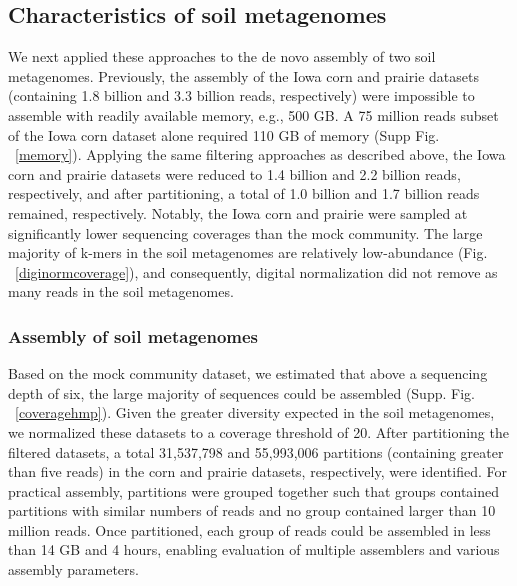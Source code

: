\documentclass[11pt]{article} %
\begin{document}
\subsection{Characteristics of soil metagenomes}

We next applied these approaches to the de novo assembly of two soil metagenomes.  Previously, the assembly of the Iowa corn and prairie datasets (containing 1.8 billion and 3.3 billion reads, respectively) were impossible to assemble with readily available memory, e.g., 500 GB.   A 75 million reads subset of the Iowa corn dataset alone required 110 GB of memory (Supp Fig. ~\ref{memory}).  Applying the same filtering approaches as described above, the Iowa corn and prairie datasets were reduced to 1.4 billion and 2.2 billion reads, respectively, and after partitioning, a total of 1.0 billion and 1.7 billion reads remained, respectively.  Notably, the Iowa corn and prairie were sampled at significantly lower sequencing coverages than the mock community.  %
The large majority of k-mers in the soil metagenomes are relatively low-abundance (Fig. ~\ref{diginormcoverage}), and consequently, digital normalization did not remove as many reads in the soil metagenomes.

\subsubsection{Assembly of soil metagenomes}

Based on the mock community dataset, we estimated that above a sequencing depth of six, the large majority of sequences could be assembled (Supp. Fig. ~\ref{coveragehmp}).  Given the greater diversity expected in the soil metagenomes, we normalized these datasets to a coverage threshold of 20.  After partitioning the filtered datasets, a total 31,537,798 and 55,993,006 partitions (containing greater than five reads) in the corn and prairie datasets, respectively, were identified.  For practical assembly, partitions were grouped together such that groups contained partitions with similar numbers of reads and no group contained larger than 10 million reads.  Once partitioned, each group of reads could be assembled in less than 14 GB and 4 hours, enabling evaluation of multiple assemblers and various assembly parameters. 
\end{document}
